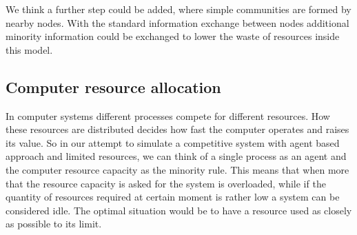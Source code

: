 We think a further step could be added, where simple communities are formed by nearby nodes.
With the standard information exchange between nodes additional minority information could be exchanged to lower the waste of resources inside this model.







\subsection{Computer resource allocation}
\label{subsec:computer resource}

In computer systems different processes compete for different resources.
How these resources are distributed decides how fast the computer operates and raises its value.
So in our attempt to simulate a competitive system with agent based approach and limited resources, we can think of a single process as an agent and the computer resource capacity as the minority rule.
This means that when more that the resource capacity is asked for the system is overloaded, while if the quantity of resources required at certain moment is rather low a system can be considered idle.
The optimal situation would be to have a resource used as closely as possible to its limit.

